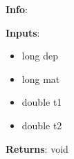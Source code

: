 \textbf{Info}:

\noindent \textbf{Inputs}:
\begin{itemize}
\item{long dep}
\item{long mat}
\item{double t1}
\item{double t2}
\end{itemize}

\noindent \textbf{Returns}: void

